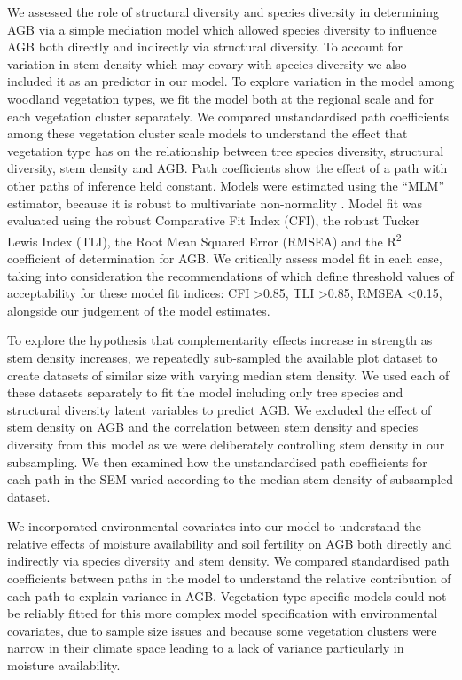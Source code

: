 \documentclass[11pt,a4paper]{article}
\begin{document}
We assessed the role of structural diversity and species diversity in determining AGB via a simple mediation model which allowed species diversity to influence AGB both directly and indirectly via structural diversity. To account for variation in stem density which may covary with species diversity we also included it as an predictor in our model. To explore variation in the model among woodland vegetation types, we fit the model both at the regional scale and for each vegetation cluster separately. We compared unstandardised path coefficients among these vegetation cluster scale models to understand the effect that vegetation type has on the relationship between tree species diversity, structural diversity, stem density and AGB. Path coefficients show the effect of a path with other paths of inference held constant. Models were estimated using the ``MLM'' estimator, because it is robust to multivariate non-normality \citep{Shapiro1983}. Model fit was evaluated using the robust Comparative Fit Index (CFI), the robust Tucker Lewis Index (TLI), the Root Mean Squared Error (RMSEA) and the R\textsuperscript{2} coefficient of determination for AGB. We critically assess model fit in each case, taking into consideration the recommendations of \citet{Hu1999} which define threshold values of acceptability for these model fit indices: CFI >0.85, TLI >0.85, RMSEA <0.15, alongside our judgement of the model estimates.

To explore the hypothesis that complementarity effects increase in strength as stem density increases, we repeatedly sub-sampled the available plot dataset to create \subn{} datasets of similar size with varying median stem density. We used each of these datasets separately to fit the model including only tree species and structural diversity latent variables to predict AGB. We excluded the effect of stem density on AGB and the correlation between stem density and species diversity from this model as we were deliberately controlling stem density in our subsampling. We then examined how the unstandardised path coefficients for each path in the SEM varied according to the median stem density of subsampled dataset.

We incorporated environmental covariates into our model to understand the relative effects of moisture availability and soil fertility on AGB both directly and indirectly via species diversity and stem density. We compared standardised path coefficients between paths in the model to understand the relative contribution of each path to explain variance in AGB. Vegetation type specific models could not be reliably fitted for this more complex model specification with environmental covariates, due to sample size issues and because some vegetation clusters were narrow in their climate space leading to a lack of variance particularly in moisture availability.
\end{document}

